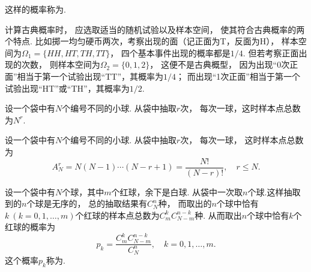 这样的概率称为.

计算古典概率时，
应选取适当的随机试验以及样本空间，
使其符合古典概率的两个特点.
比如掷一均匀硬币两次，考察出现的面（记正面为T，反面为H），
样本空间为\(\Omega_1 = \{ HH, HT, TH, TT \}\)，
四个基本事件出现的概率都是\(1/4\).
但若考察正面出现的次数，
则样本空间为\(\Omega_2 = \{ 0,1,2 \}\)，
这便不是古典概型，
因为出现“0次正面”相当于第一个试验出现“TT”，其概率为\(1/4\)；
而出现“1次正面”相当于第一个试验出现“HT”或“TH”，其概率为\(1/2\).

\begin{example}
设一个袋中有\(N\)个编号不同的小球.
从袋中抽取\(r\)次，
每次一球，这时样本点总数为\(N^r\).
\end{example}

\begin{example}
设一个袋中有\(N\)个编号不同的小球.
从袋中抽取\(r\)次，
每次一球，
这时样本点总数为\begin{equation*}
	A_N^r = N(N-1)\dotsb(N-r+1) = \frac{N!}{(N-r)!},
	\quad
	r \leq N.
\end{equation*}
\end{example}

\begin{example}
设一个袋中有\(N\)个球，其中\(m\)个红球，余下是白球.
从袋中一次取\(n\)个球.这样抽取到的\(n\)个球是无序的，
总的抽取结果有\(C_N^n\)种，
而取出的\(n\)个球中恰有\(k\ (k=0,1,\dotsc,m)\)个红球的样本点总数为\(C_m^k C_{N-m}^{n-k}\)种.
从而取出\(n\)个球中恰有\(k\)个红球的概率为\begin{equation*}
	p_k = \frac{C_m^k C_{N-m}^{n-k}}{C_N^n},
	\quad k=0,1,\dotsc,m.
\end{equation*}
这个概率\(p_k\)称为.
\end{example}


